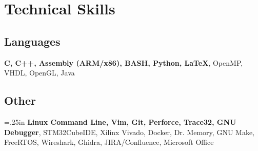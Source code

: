 \documentclass{article}
\begin{document}
\section{Technical Skills}
\subsection{Languages} 
\textbf{C, C++, Assembly (ARM/x86), BASH, Python, \LaTeX}, OpenMP, VHDL, OpenGL, Java

\subsection{Other}
\hangindent=.25in
\textbf{Linux Command Line, Vim, Git, Perforce, Trace32, GNU Debugger}, STM32CubeIDE, Xilinx Vivado, Docker, Dr. Memory, GNU Make, FreeRTOS, Wireshark, Ghidra, JIRA/Confluence, Microsoft Office 
\end{document}
